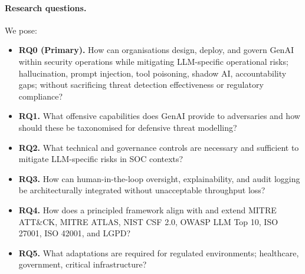 \documentclass[preprint,12pt,authoryear]{elsarticle}
\begin{document}
\paragraph{Research questions.} We pose:
\begin{itemize}
  \item \textbf{RQ0 (Primary).} How can organisations design, deploy, and govern GenAI within security operations while mitigating LLM-specific operational risks; hallucination, prompt injection, tool poisoning, shadow AI, accountability gaps; without sacrificing threat detection effectiveness or regulatory compliance?
  \item \textbf{RQ1.} What offensive capabilities does GenAI provide to adversaries and how should these be taxonomised for defensive threat modelling?
  \item \textbf{RQ2.} What technical and governance controls are necessary and sufficient to mitigate LLM-specific risks in SOC contexts?
  \item \textbf{RQ3.} How can human-in-the-loop oversight, explainability, and audit logging be architecturally integrated without unacceptable throughput loss?
  \item \textbf{RQ4.} How does a principled framework align with and extend MITRE ATT\&CK, MITRE ATLAS, NIST CSF 2.0, OWASP LLM Top 10, ISO 27001, ISO 42001, and LGPD?
  \item \textbf{RQ5.} What adaptations are required for regulated environments; healthcare, government, critical infrastructure?
\end{itemize}

\end{document}
